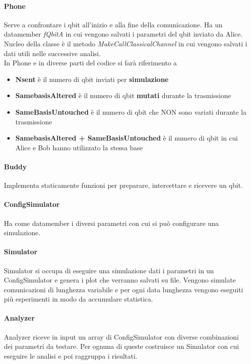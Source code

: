 \documentclass[11 pt, a4paper]{article}
\begin{document}
\paragraph{Phone}
Serve a confrontare i qbit all'inizio e alla fine della comunicazione. Ha un datamember \textit{fQbitA} in cui vengono salvati i parametri del qbit inviato da Alice. Nucleo della classe è il metodo \textit{MakeCallClassicalChannel} in cui vengono salvati i dati utili nelle successive analisi.\\In Phone e in diverse parti del codice si farà riferimento a
\begin{itemize}
\item \textbf{Nsent} è il numero di qbit inviati per \textbf{simulazione}
\item \textbf{SamebasisAltered} è il numero di qbit \textbf{mutati} durante la trasmissione
\item \textbf{SameBasisUntouched} è il numero di qbit che NON sono variati durante la trasmissione
\item \textbf{SamebasisAltered + SameBasisUntouched} è il numero di qbit in cui Alice e Bob hanno utilizzato la stessa base
\end{itemize}

\paragraph{Buddy}
Implementa staticamente funzioni per preparare, intercettare e ricevere un qbit.

\paragraph{ConfigSimulator}
Ha come datamember i diversi parametri con cui si può configurare una simulazione.

\paragraph{Simulator}
Simulator si occupa di eseguire una simulazione dati i parametri in un ConfigSimulator e genera i plot che verranno salvati su file. Vengono simulate comunicazioni di lunghezza variabile e per ogni data lunghezza vengono eseguiti più esperimenti in modo da accumulare statistica.

\paragraph{Analyzer}
Analyzer riceve in input un array di ConfigSimulator con diverse combinazioni dei parametri da testare. Per ognuna di queste costruisce un Simulator con cui eseguire le analisi e poi raggruppa i risultati.
\end{document}
